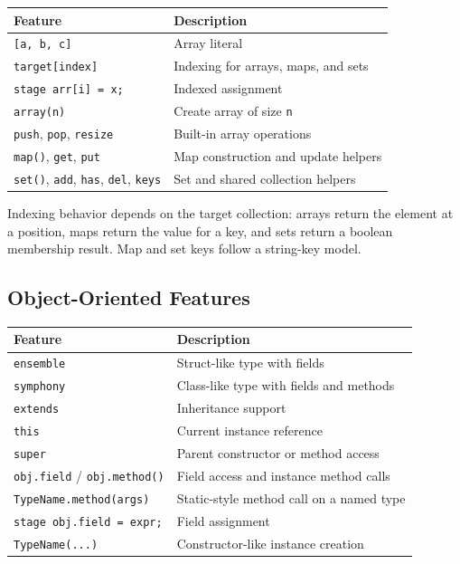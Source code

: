 \documentclass[12pt,a4paper]{article}
\begin{document}
\begin{table}[H]
\centering
\begin{tabularx}{\textwidth}{l X}
\toprule
\textnormal{Feature} & \textnormal{Description} \\
\midrule
\texttt{[a, b, c]} & Array literal \\
\texttt{target[index]} & Indexing for arrays, maps, and sets \\
\texttt{stage arr[i] = x;} & Indexed assignment \\
\texttt{array(n)} & Create array of size \texttt{n} \\
\texttt{push}, \texttt{pop}, \texttt{resize} & Built-in array operations \\
\texttt{map()}, \texttt{get}, \texttt{put} & Map construction and update helpers \\
\texttt{set()}, \texttt{add}, \texttt{has}, \texttt{del}, \texttt{keys} & Set and shared collection helpers \\
\bottomrule
\end{tabularx}
\end{table}

Indexing behavior depends on the target collection: arrays return the element at a position, maps return the value for a key, and sets return a boolean membership result. Map and set keys follow a string-key model.

\subsection*{Object-Oriented Features}

\begin{table}[H]
\centering
\begin{tabularx}{\textwidth}{l X}
\toprule
\textnormal{Feature} & \textnormal{Description} \\
\midrule
\texttt{ensemble} & Struct-like type with fields \\
\texttt{symphony} & Class-like type with fields and methods \\
\texttt{extends} & Inheritance support \\
\texttt{this} & Current instance reference \\
\texttt{super} & Parent constructor or method access \\
\texttt{obj.field} / \texttt{obj.method()} & Field access and instance method calls \\
\texttt{TypeName.method(args)} & Static-style method call on a named type \\
\texttt{stage obj.field = expr;} & Field assignment \\
\texttt{TypeName(...)} & Constructor-like instance creation \\
\bottomrule
\end{tabularx}
\end{table}
\end{document}
